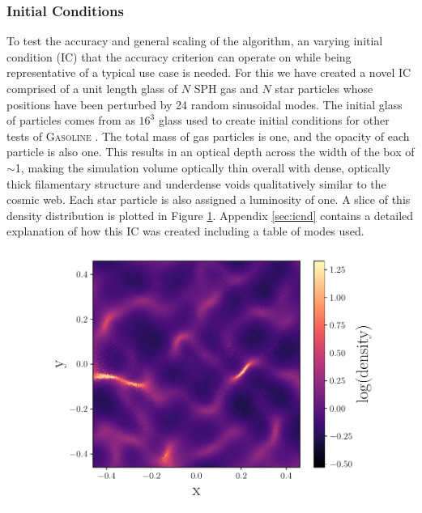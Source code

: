 \documentclass[fleq,usenatbib]{mnras}
\begin{document}
\subsubsection{Initial Conditions}
To test the accuracy and general scaling of the algorithm, an varying initial 
condition (IC) that the accuracy criterion can operate on while being 
representative of a typical use case is needed. For this we have created a 
novel IC comprised of a unit length glass of $N$ SPH gas and $N$ star 
particles whose positions have been perturbed by 24 random sinusoidal modes. 
The initial glass of particles comes from as $16^3$ glass used to create 
initial conditions for other tests of \textsc{Gasoline} \citep{wadsleyEt17}. 
The total mass of gas particles is one, and the opacity of each particle is 
also one. This results in an optical depth across the width of the box of 
$\sim$1, making the simulation volume optically thin overall with dense, 
optically thick filamentary structure and underdense voids qualitatively 
similar to the cosmic web. Each star particle is also assigned a luminosity of 
one. A slice of this density distribution is plotted in Figure 
\ref{fig:sine_rho}. Appendix \ref{sec:icnd} contains a detailed explanation of 
how this IC was created including a table of modes used.
\begin{figure}
\includegraphics[width=1\linewidth]{Figures/sine_rho.pdf}
\caption{}
\label{fig:sine_rho}
\end{figure}
\end{document}
